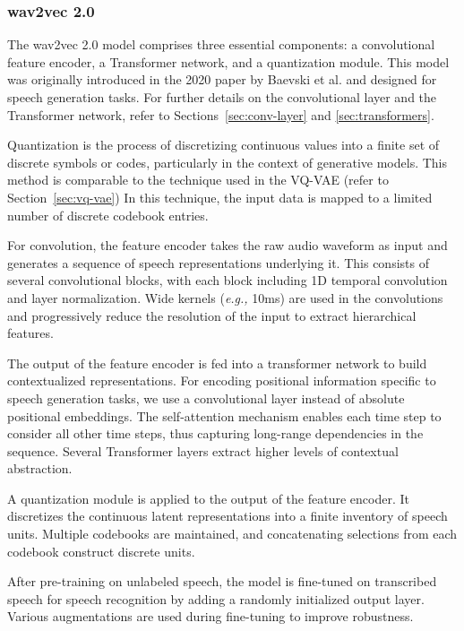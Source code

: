 \subsubsection{wav2vec 2.0}

The wav2vec 2.0 model comprises three essential components: a convolutional feature encoder, a Transformer network, and a quantization module. This model was originally introduced in the 2020 paper by Baevski et al. \cite{baevski_wav2vec_2020} and designed for speech generation tasks. For further details on the convolutional layer and the Transformer network, refer to Sections~\ref{sec:conv-layer} and \ref{sec:transformers}.

Quantization is the process of discretizing continuous values into a finite set of discrete symbols or codes, particularly in the context of generative models. This method is comparable to the technique used in the \ac{VQ-VAE} (refer to Section~\ref{sec:vq-vae}) In this technique, the input data is mapped to a limited number of discrete codebook entries.

For convolution, the feature encoder takes the raw audio waveform as input and generates a sequence of speech representations underlying it. This consists of several convolutional blocks, with each block including 1D temporal convolution and layer normalization. Wide kernels (\textit{e.g.,} 10ms) are used in the convolutions and progressively reduce the resolution of the input to extract hierarchical features.

The output of the feature encoder is fed into a transformer network to build contextualized representations. For encoding positional information specific to speech generation tasks, we use a convolutional layer instead of absolute positional embeddings. The self-attention mechanism enables each time step to consider all other time steps, thus capturing long-range dependencies in the sequence. Several Transformer layers extract higher levels of contextual abstraction.

A quantization module is applied to the output of the feature encoder. It discretizes the continuous latent representations into a finite inventory of speech units. Multiple codebooks are maintained, and concatenating selections from each codebook construct discrete units.

After pre-training on unlabeled speech, the model is fine-tuned on transcribed speech for speech recognition by adding a randomly initialized output layer. Various augmentations are used during fine-tuning to improve robustness.


